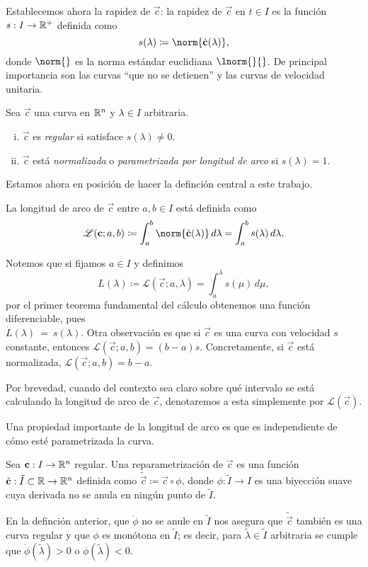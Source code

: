 Establecemos ahora la rapidez de $\vec c$: la rapidez de $\vec c$ en $t \in I$ es la función $s : I \to \mathbb R^+$ definida como 
\begin{equation}
	s(\lambda) \coloneqq \norm{\dot{\vec c}(\lambda)},
\end{equation}
donde $\norm{}$ es la norma estándar euclidiana $\lnorm{}{}$. 
De principal importancia son las curvas ``que no se detienen'' y las curvas de velocidad unitaria.
\begin{definition}
	Sea $\vec c$ una curva en $\mathbb R^n$ y $\lambda \in I$ arbitraria.
	\begin{enumerate}[(i)]
		\item $\vec c$ es \emph{regular} si satisface $s(\lambda) \neq 0$.
	
		\item $\vec c$ está \emph{normalizada} o \emph{parametrizada por longitud de arco} si $s(\lambda) = 1$.
	\end{enumerate}
\end{definition}
Estamos ahora en posición de hacer la definción central a este trabajo.
\begin{definition}\label{def: arcL}
	La longitud de arco de $\vec c$ entre $a, b \in I$ está definida como
	\begin{equation}
		\mathscr L(\vec c; a, b) \coloneqq \int_{a}^{b} \norm{\dot{\vec c}(\lambda)} \, d\lambda
		= \int_{a}^{b} s(\lambda) \, d\lambda.
	\end{equation}
\end{definition}
	Notemos que si fijamos $a \in I$ y definimos
	\begin{equation}
		L(\lambda) \coloneqq \mathscr L(\vec c; a, \lambda) = \int_{a}^{\lambda}s(\mu) \, d\mu,
	\end{equation}
por el primer teorema fundamental del cálculo obtenemos una función diferenciable, pues \\ $\dot L(\lambda)~=~s(\lambda)$. Otra observación es que si $\vec c$ es una curva con velocidad $s$ constante, entonces $\mathscr L(\vec c; a, b) = (b - a)s$. Concretamente, si $\vec c$ está normalizada, $\mathscr L(\vec c; a, b) = b - a$.

Por brevedad, cuando del contexto sea claro sobre qué intervalo se está calculando la longitud de arco de $\vec c$, denotaremos a esta simplemente por $\mathscr L(\vec c)$.

Una propiedad importante de la longitud de arco es que es independiente de cómo esté parametrizada la curva.
\begin{definition}
	Sea $\mathbf c : I \to \mathbb R^n$ regular. Una reparametrización de $\vec c$ es una función $\tilde{\mathbf c} : \tilde{I} \subset \mathbb R \to \mathbb R^n$ definida como $\tilde{\vec c} \coloneqq \vec c \circ \phi$, donde $\phi : \tilde{I} \to I$ es una biyección suave cuya derivada no se anula en ningún punto de $\tilde{I}$.
\end{definition}
En la definción anterior, que $\dot \phi$ no se anule en $\tilde I$ nos asegura que $\tilde{\vec c}$ también es una curva regular y que $\phi$ es monótona en $\tilde I$; es decir, para $\tilde\lambda \in \tilde I$ arbitraria se cumple que $\dot \phi(\tilde\lambda) > 0$ o $\phi(\tilde\lambda) < 0$.

